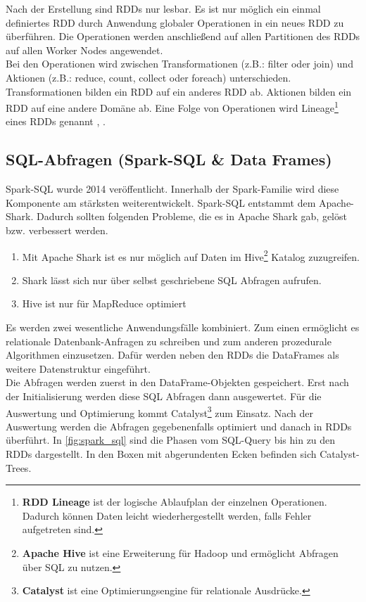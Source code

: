 \noindent
Nach der Erstellung sind RDDs nur lesbar. Es ist nur möglich ein einmal definiertes RDD durch Anwendung globaler Operationen in ein neues RDD zu überführen. Die Operationen werden anschließend auf allen Partitionen des RDDs auf allen Worker Nodes angewendet. \\

\noindent
Bei den Operationen wird zwischen Transformationen (z.B.: filter oder join) und Aktionen (z.B.: reduce, count, collect oder foreach) unterschieden. Transformationen bilden ein RDD auf ein anderes RDD ab. Aktionen bilden ein RDD auf eine andere Domäne ab. Eine Folge von Operationen wird Lineage\footnote{\textbf{RDD Lineage} ist der logische Ablaufplan der einzelnen Operationen. Dadurch können Daten leicht wiederhergestellt werden, falls Fehler aufgetreten sind.} eines RDDs genannt \cite{ZC+12}, \cite[11]{AAWS15}.



\newpage
\subsection{SQL-Abfragen (Spark-SQL \& Data Frames)}\label{sec_sparksql}

Spark-SQL wurde 2014 veröffentlicht. Innerhalb der Spark-Familie wird diese Komponente am stärksten weiterentwickelt. Spark-SQL entstammt dem Apache-Shark. Dadurch sollten folgenden Probleme, die es in Apache Shark gab, gelöst bzw. verbessert werden.
\begin{enumerate}
	\item Mit Apache Shark ist es nur möglich auf Daten im Hive\footnote{\textbf{Apache Hive} ist eine Erweiterung für Hadoop und ermöglicht Abfragen über SQL zu nutzen.} Katalog zuzugreifen. 
	\item Shark lässt sich nur über selbst geschriebene SQL Abfragen aufrufen. 
	\item Hive ist nur für MapReduce optimiert
\end{enumerate}

\noindent
Es werden zwei wesentliche Anwendungsfälle kombiniert. Zum einen ermöglicht es relationale Datenbank-Anfragen zu schreiben und zum anderen prozedurale Algorithmen einzusetzen. 
Dafür werden neben den RDDs die DataFrames als weitere Datenstruktur eingeführt.\\

\noindent
Die Abfragen werden zuerst in den DataFrame-Objekten gespeichert. Erst nach der Initialisierung werden diese SQL Abfragen dann ausgewertet. Für die Auswertung und Optimierung kommt Catalyst\footnote{\textbf{Catalyst} ist eine Optimierungsengine für relationale Ausdrücke.} zum Einsatz. Nach der Auswertung werden die Abfragen gegebenenfalls optimiert und danach in RDDs überführt. In \autoref{fig:spark_sql} sind die Phasen vom SQL-Query bis hin zu den RDDs dargestellt. In den Boxen mit abgerundenten Ecken befinden sich Catalyst-Trees.

